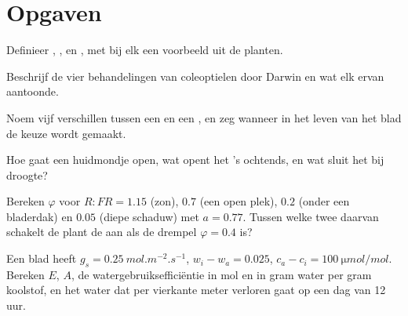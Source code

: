 \section{Opgaven}

\begin{exercise}[$\star$]\label{exo:b2:plant-plasticity:1}
Definieer , ,  en
, met bij elk een voorbeeld uit de planten.
\end{exercise}

\begin{exercise}[$\star$]\label{exo:b2:plant-plasticity:2}
Beschrijf de vier behandelingen van coleoptielen door Darwin en wat elk ervan aantoonde.
\end{exercise}

\begin{exercise}[$\star$]\label{exo:b2:plant-plasticity:3}
Noem vijf verschillen tussen een  en een , en zeg
wanneer in het leven van het blad de keuze wordt gemaakt.
\end{exercise}

\begin{exercise}[$\star$]\label{exo:b2:plant-plasticity:4}
Hoe gaat een huidmondje open, wat opent het 's ochtends, en wat sluit het
bij droogte?
\end{exercise}

\begin{exercise}[$\star\star$]\label{exo:b2:plant-plasticity:5}
Bereken $\varphi$ voor $R{:}FR = 1.15$ (zon), $0.7$ (een open plek), $0.2$
(onder een bladerdak) en $0.05$ (diepe schaduw) met $a = 0.77$. Tussen welke
twee daarvan schakelt de plant de  aan als de drempel
$\varphi = 0.4$ is?
\end{exercise}

\begin{exercise}[$\star\star$]\label{exo:b2:plant-plasticity:6}
Een blad heeft $g_s = \qty{0.25}{mol.m^{-2}.s^{-1}}$, $w_i - w_a = 0.025$,
$c_a - c_i = \qty{100}{\micro mol/mol}$. Bereken $E$, $A$, de
watergebruiksefficiëntie in mol en in gram water per gram koolstof, en het
water dat per vierkante meter verloren gaat op een dag van 12 uur.
\end{exercise}

